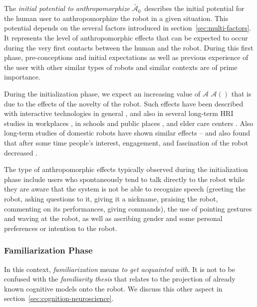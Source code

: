 \documentclass{frontiersSCNS} %
\newcommand{\Ant}[1][]{%
      \ifthenelse{\isempty{#1}}%
        {$\mathcal{A}$}
        {$\mathcal{A}(#1)$}
}
\newcommand{\IPAe}{{$\widetilde{\mathcal{A}_0}$~}}
\begin{document}
The \emph{initial potential to anthropomorphize} \IPAe describes the initial
potential for the human user to anthropomorphize the robot in a given situation.
This potential depends on the several factors introduced in
section~\ref{sec:multi-factors}.  It represents the level of anthropomorphic
effects that can be expected to occur during the very first contacts between the
human and the robot. During this first phase, pre-conceptions and initial
expectations as well as previous experience of the user with other similar types
of robots and similar contexts are of prime importance.

During the initialization phase, we expect an increasing value of \Ant that is
due to the effects of the novelty of the robot. Such effects have been described
with interactive technologies in general \citep{rogers_diffusion_1995}, and also
in several long-term HRI studies in workplaces
\citep{huttenrauch_fetch-and-carry_2003,mutlu_robots_2008}, in schools and
public places
\citep{gockley_designing_2005,kanda_communication_2005,kanda_interactive_2004},
and elder care centers \citep{sabelli_conversational_2011}. Also long-term
studies of domestic robots have shown similar effects -- and also found that
after some time people's interest, engagement, and fascination of the robot
decreased
\citep{sung_robots_2009,sung_domestic_2010,fernaeus_how_2010,fink_living_2013}.

The type of anthropomorphic effects typically observed during the initialization
phase include users who spontaneously tend to talk directly to the robot while
they are aware that the system is not be able to recognize speech (greeting the
robot, asking questions to it, giving it a nickname, praising the robot,
commenting on its performances, giving commands), the use of pointing gestures
and waving at the robot, as well as ascribing gender and some personal
preferences or intention to the robot.

\subsubsection{Familiarization Phase\\}

In this context, \emph{familiarization} means \emph{to get acquainted with}.
It is not to be confused with the \emph{familiarity thesis} that relates to the
projection of already known cognitive models onto the robot. We discuss this other
aspect in section~\ref{sec:cognition-neuroscience}.
\end{document}
